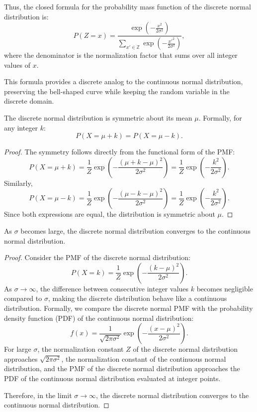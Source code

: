 Thus, the closed formula for the probability mass function of the discrete normal distribution is:
\[
P(Z = x) = \frac{\exp\left(-\frac{x^2}{2\sigma^2}\right)}{\sum_{x' \in \mathbb{Z}} \exp\left(-\frac{x'^2}{2\sigma^2}\right)},
\]
where the denominator is the normalization factor that sums over all integer values of \( x \).

This formula provides a discrete analog to the continuous normal distribution, preserving the bell-shaped curve while keeping the random variable in the discrete domain.

\begin{proposition}
The discrete normal distribution is symmetric about its mean $\mu$. Formally, for any integer $k$:
\[
P(X = \mu + k) = P(X = \mu - k).
\]
\end{proposition}
\begin{proof}
The symmetry follows directly from the functional form of the PMF:
\[
P(X = \mu + k) = \frac{1}{Z} \exp\left(-\frac{(\mu + k - \mu)^2}{2\sigma^2}\right) = \frac{1}{Z} \exp\left(-\frac{k^2}{2\sigma^2}\right).
\]
Similarly,
\[
P(X = \mu - k) = \frac{1}{Z} \exp\left(-\frac{(\mu - k - \mu)^2}{2\sigma^2}\right) = \frac{1}{Z} \exp\left(-\frac{k^2}{2\sigma^2}\right).
\]
Since both expressions are equal, the distribution is symmetric about $\mu$.
\end{proof}


\begin{proposition}
As $\sigma$ becomes large, the discrete normal distribution converges to the continuous normal distribution.
\end{proposition}
\begin{proof}
Consider the PMF of the discrete normal distribution:
\[
P(X = k) = \frac{1}{Z} \exp\left(-\frac{(k - \mu)^2}{2\sigma^2}\right).
\]
As $\sigma \to \infty$, the difference between consecutive integer values $k$ becomes negligible compared to $\sigma$, making the discrete distribution behave like a continuous distribution. Formally, we compare the discrete normal PMF with the probability density function (PDF) of the continuous normal distribution:
\[
f(x) = \frac{1}{\sqrt{2\pi \sigma^2}} \exp\left(-\frac{(x - \mu)^2}{2\sigma^2}\right).
\]
For large $\sigma$, the normalization constant $Z$ of the discrete normal distribution approaches $\sqrt{2\pi \sigma^2}$, the normalization constant of the continuous normal distribution, and the PMF of the discrete normal distribution approaches the PDF of the continuous normal distribution evaluated at integer points.

Therefore, in the limit $\sigma \to \infty$, the discrete normal distribution converges to the continuous normal distribution.
\end{proof}

